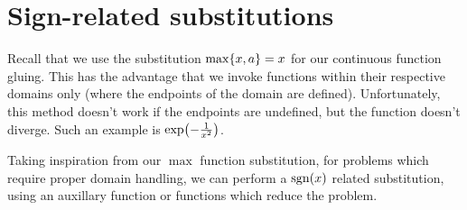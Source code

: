 \section{Sign-related substitutions}
Recall that we use the substitution $\max\{x,a\}=x$ for our continuous function gluing. This has the advantage that we invoke functions within their respective domains only (where the endpoints of the domain are defined). Unfortunately, this method doesn't work if the endpoints are undefined, but the function doesn't diverge. Such an example is $\exp\paren*{-\frac{1}{x^2}}$.

Taking inspiration from our $\max$ function substitution, for problems which require proper domain handling, we can perform a $\sgn{x}$ related substitution, using an auxillary function or functions which reduce the problem.

